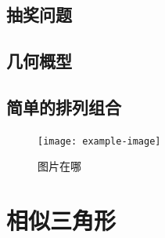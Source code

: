 \documentclass{ecnuthesis}
\begin{document}
\section{抽奖问题}
\clearpage
\section{几何概型}
\clearpage
\section{简单的排列组合}
\clearpage


\begin{figure}
    \centering
    \texttt{[image: example-image]}
    \caption{图片在哪}
\end{figure}
\chapter{相似三角形}
\end{document}
